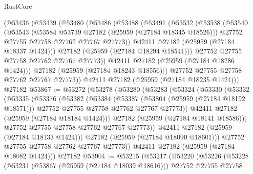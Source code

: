 \begin{lexlean}{RustCore}
\begin{coremodule}
      (@53436
        (@53439
          (@53480
            (@53486
              (@53488
                (@53491
                  (@53532
                    (@53538
                      (@53540
                        (@53543
                          (@53584 @53739 @27182 (@25959 (@27184 @18345 @18526)))
                          @27752
                          @27755
                          @27758
                          @27762
                          @27767
                          @27773))
                      @42411
                      @27182
                      (@25959 (@27184 @18337 @1424)))
                    @27182
                    (@25959 (@27184 @18294 @18541)))
                  @27752
                  @27755
                  @27758
                  @27762
                  @27767
                  @27773))
              @42411
              @27182
              (@25959 (@27184 @18286 @1424)))
            @27182
            (@25959 (@27184 @18243 @18556)))
          @27752
          @27755
          @27758
          @27762
          @27767
          @27773))
      @42411
      @27182
      (@25959 (@27184 @18235 @1424)))
    @27182
@53867 := @53272
    (@53278
      (@53280
        (@53283
          (@53324
            (@53330
              (@53332
                (@53335
                  (@53376
                    (@53382
                      (@53384
                        (@53387
                          (@53804 (@25959 (@27184 @18192 @18571)))
                          @27752
                          @27755
                          @27758
                          @27762
                          @27767
                          @27773))
                      @42411
                      @27182
                      (@25959 (@27184 @18184 @1424)))
                    @27182
                    (@25959 (@27184 @18141 @18586)))
                  @27752
                  @27755
                  @27758
                  @27762
                  @27767
                  @27773))
              @42411
              @27182
              (@25959 (@27184 @18133 @1424)))
            @27182
            (@25959 (@27184 @18090 @18601)))
          @27752
          @27755
          @27758
          @27762
          @27767
          @27773))
      @42411
      @27182
      (@25959 (@27184 @18082 @1424)))
    @27182
@53904 := @53215
    (@53217
      (@53220
        (@53226
          (@53228
            (@53231
              (@53867 (@25959 (@27184 @18039 @18616)))
              @27752
              @27755
              @27758

\end{coremodule}
\end{lexlean}

